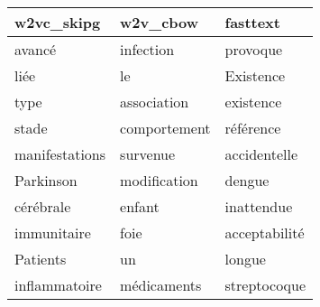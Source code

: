 \begin{tabular}{lll}
\toprule
     w2vc\_skipg &      w2v\_cbow &       fasttext \\
\midrule
         avancé &     infection &       provoque \\
           liée &            le &      Existence \\
           type &   association &      existence \\
          stade &  comportement &      référence \\
 manifestations &      survenue &   accidentelle \\
      Parkinson &  modification &         dengue \\
      cérébrale &        enfant &     inattendue \\
    immunitaire &          foie &  acceptabilité \\
       Patients &            un &         longue \\
  inflammatoire &   médicaments &   streptocoque \\
\bottomrule
\end{tabular}
